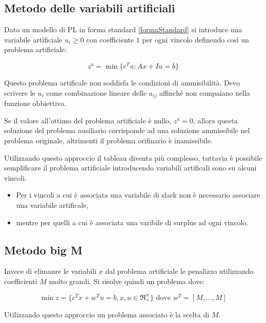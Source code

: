 \subsection{Metodo delle variabili artificiali}
Dato un modello di PL in forma standard \ref{formaStandard} si introduce una variabile artificiale $u_i\geq0$ con coefficiente $1$ per ogni vincolo definendo così un problema artificiale:

\begin{equation} \label{problemaArtificiale}
z^{a} = \min \{ e^{T}u : Ax+Iu=\bar{b} \}
\end{equation}

Questo problema artificale non soddisfa le condizioni di ammisibilità. Devo scrivere le $u_i$ come combinazione lineare delle $a_{ij}$ affinché non compaiano nella funzione obbiettivo.

Se il valore all'ottimo del problema artificiale è nullo, $z^a=0$, allora questa soluzione del problema ausiliario corrisponde ad una soluzione ammissibile nel problema originale, altrimenti il problema orifinario è inamissibile.

Utilizzando questo approccio il tableau diventa più complesso, tuttavia è possibile semplificare il problema artificiale introducendo variabili artificali sono su alcuni vincoli.

\begin{itemize}
	\item Per i vincoli a cui è associata una variabile di slack non è necessario associare una variabile artificale, %
	\item mentre per quelli a cui è associata una varibile di surplus ad ogni vincolo. %
\end{itemize}

\subsection{Metodo big M}
Invece di elimanre le variabili $x$ dal problema artificiale le penalizzo utilizzando coefficienti $M$ molto grandi.
Si risolve quindi un problema dove:

\begin{equation} \label{MetodoBigM}
\min z = \{ c^{T}x+w^{T}u=b , x,u \in \Re^{n}_+ \} \text{	dove } w^{T} = [M, \dotsc, M] 
\end{equation}

Utilizzando questo approccio un problema associato è la scelta di $M$.

